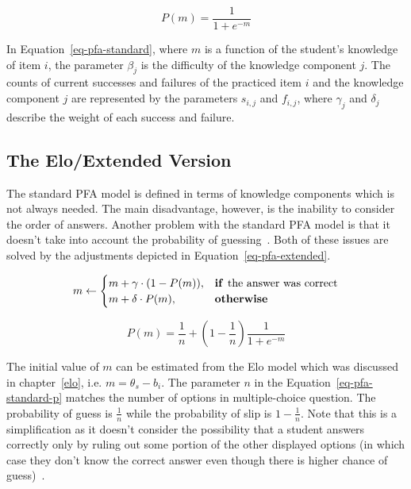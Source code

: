 \begin{equation} \label{eq-pfa-standard-p}
  P(m) = \frac{1}{1 + e^{-m}}
\end{equation}

In Equation~\ref{eq-pfa-standard}, where $m$ is a function of the student's knowledge of item $i$, the parameter $\beta_j$ is the difficulty of the knowledge component $j$. The counts of current successes and failures of the practiced item $i$ and the knowledge component $j$ are represented by the parameters $s_{i,j}$ and $f_{i,j}$, where $\gamma_j$ and $\delta_j$ describe the weight of each success and failure.

\subsection*{The Elo/Extended Version}
\label{pfae}

The standard PFA model is defined in terms of knowledge components which is not always needed. The main disadvantage, however, is the inability to consider the order of answers. Another problem with the standard PFA model is that it doesn't take into account the probability of guessing~\cite{Papousek2014}. Both of these issues are solved by the adjustments depicted in Equation~\ref{eq-pfa-extended}.

\begin{equation} \label{eq-pfa-extended}
  m \gets \begin{cases}
            m + \gamma \cdot (1 - P(m)), & \text{\textbf{if }} \text{the answer was correct} \\
            m + \delta \cdot P(m), & \text{\textbf{otherwise}}
          \end{cases}
\end{equation}

\begin{equation} \label{eq-pfa-standard-p}
  P(m) = \frac{1}{n} + \left(1 - \frac{1}{n}\right)\frac{1}{1 + e^{-m}}
\end{equation}

The initial value of $m$ can be estimated from the Elo model which was discussed in chapter~\ref{elo}, i.e. $m = \theta_s - b_i$. The parameter $n$ in the Equation~\ref{eq-pfa-standard-p} matches the number of options in multiple-choice question. The probability of guess is $\frac{1}{n}$ while the probability of slip is $1 - \frac{1}{n}$. Note that this is a simplification as it doesn't consider the possibility that a student answers correctly only by ruling out some portion of the other displayed options (in which case they don't know the correct answer even though there is higher chance of guess)~\cite{Pelanek2015a}. 

